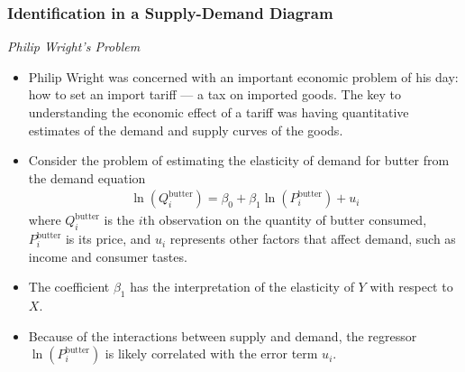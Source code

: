 

\begin{frame}
\frametitle{Identification in a Supply-Demand Diagram}
\emph{Philip Wright's Problem} 
\begin{itemize}
\item Philip Wright was concerned with an important economic problem of his day: how to set an import tariff --- a tax on imported goods. The key to understanding the economic effect of a tariff was having quantitative estimates of the demand and supply curves of the goods. 
\item Consider the problem of estimating the elasticity of demand for butter from the demand equation
\begin{align*}
\ln(Q_{i}^{\text{butter}}) = \beta_{0} + \beta_{1} \ln(P_{i}^{\text{butter}}) + u_{i}
\end{align*}
where $Q_{i}^{\text{butter}}$ is the $i$th observation on the quantity of butter consumed, $P_{i}^{\text{butter}}$ is its price, and $u_{i}$ represents other factors that affect demand, such as income and consumer tastes.
\item The coefficient $\beta_{1}$ has the interpretation of the elasticity of $Y$ with respect to $X$.
\item Because of the interactions between supply and demand, the regressor $\ln(P_{i}^{\text{butter}})$ is likely correlated with the error term $u_{i}$. 
\end{itemize}
\end{frame}


